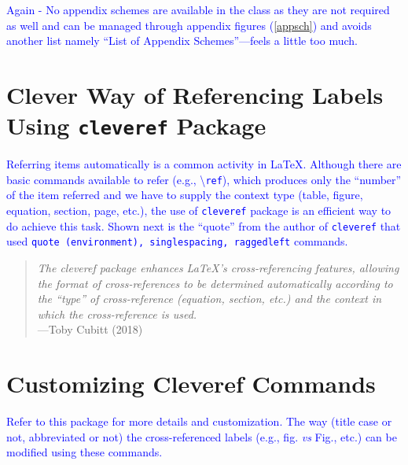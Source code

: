 \documentclass[phd]{ndsu-thesis-2022}
\newcommand\italk[1]{\textcolor{blue}{#1}}  %
\newcommand\cmd[1]{\textbackslash\texttt{#1}}  %
\begin{document}
\kant[4]\kant[9]

\italk{Again - No appendix schemes are available in the class as they are not required as well and can be managed through appendix figures (\cref{appsch}) and avoids another list namely ``List of Appendix Schemes''---feels a little too much.}




\section{Clever Way of Referencing Labels Using \texttt{cleveref} Package}
\italk{Referring items automatically is a common activity in \LaTeX. Although there are basic commands available to refer (e.g., \cmd{ref}), which produces only the ``number'' of the item referred and we have to supply the context type (table, figure, equation, section, page, etc.), the use of \texttt{cleveref} package is an efficient way to do achieve this task. Shown next is the ``quote'' from the author of \texttt{cleveref} that used \texttt{quote (environment), singlespacing, raggedleft} commands.}

\vspace{-4ex}
\textcolor{magenta}{
\begin{quote}
\singlespacing
\raggedleft
\textit{The cleveref package enhances \LaTeX's cross-referencing features, allowing the format of cross-references to be determined automatically according to the ``type'' of cross-reference (equation, section, etc.) and the context in which the cross-reference is used.} 
\\\hfill---Toby Cubitt (2018)
\end{quote}
}

\section{Customizing Cleveref Commands}
\italk{Refer to this package for more details and customization. The way (title case or not, abbreviated or not) the cross-referenced labels (e.g., fig. \emph{vs} Fig., etc.) can be modified using these commands. 
}
\end{document}
